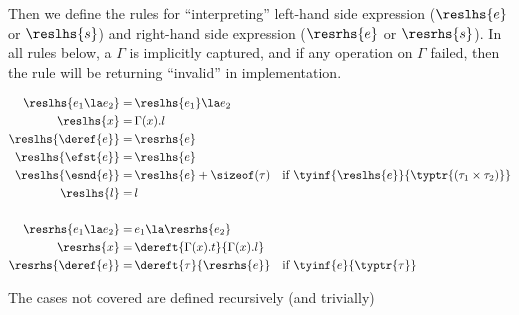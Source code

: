 Then we define the rules for ``interpreting'' left-hand side expression ($\reslhs{e}$ or $\reslhs{s}$)
and right-hand side expression ($\resrhs{e}$ or $\resrhs{s}$). In all rules below, a $\Gamma$ is implicitly
captured, and if any operation on $\Gamma$ failed, then the rule will be returning ``invalid'' in implementation.

\begin{align*}
\reslhs{e_1 \la e_2} =&\, \reslhs{e_1} \la e_2\\
\reslhs{x} =&\, \Gamma(x).l \\
\reslhs{\deref{e}} =&\, \resrhs{e} \\
\reslhs{\efst{e}} =&\, \reslhs{e} \\
\reslhs{\esnd{e}} =&\, \reslhs{e} + \sizeof(\tau) \quad \text{if } \tyinf{\reslhs{e}}{\typtr{(\tau_1 \times \tau_2)}}\\
\reslhs{l} =&\, l\\
\\
\resrhs{e_1 \la e_2} =&\, e_1 \la \resrhs{e_2}\\
\resrhs{x} =&\, \dereft{\Gamma(x).t}{\Gamma(x).l} \\
\resrhs{\deref{e}} =&\, \dereft{\tau}{\resrhs{e}} \quad \text{if } \tyinf{e}{\typtr{\tau}}
\end{align*}

The cases not covered are defined recursively (and trivially)

